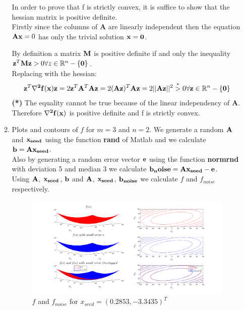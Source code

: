 \documentclass[12pt]{article}
\begin{document}
\begin{enumerate}
\begin{enumerate}
In order to prove that f is strictly convex, it is  suffice to show that the hessian matrix is positive definite.\\
Firstly since the columns of {\bf A} are linearly independent then the equation ${\bf A}{\bf x}=0$ has only the trivial solution ${{\bf x}={\bf 0}}$.

By definition a matrix ${\bf M}$ is positive definite if and only the inequality ${\bf z}^T{\bf M}{\bf z}>0 \forall z\in \mathbb{R}^n-\{{\bf 0}\}$.\\
Replacing with the hessian:\\
\begin{equation}
	\begin{split}
		{\bf z}^T{\bf \nabla^2f({\bf x})}{\bf z}=2{\bf z}^T{\bf A}^T{\bf A}{\bf z}=2({\bf A}{\bf z})^T{\bf A}{\bf z} = 2||{\bf A}{\bf z}||^2\overset{*}{>} 0 \forall {\bf z}\in \mathbb{R}^n -\{{\bf 0}\}
	\end{split}
\end{equation}
{\bf (*)} The equality cannot be true because of the linear independency of {\bf A}.\\

Therefore ${\bf \nabla^2f({\bf x})}$ is positive definite and f is strictly convex.\\

\item Plots and contours of $f$ for $m=3$ and $n=2$. We generate a random ${\bf A}$ and ${\bf x_{seed}}$ using the function {\bf rand} of Matlab and we calculate ${\bf b}={\bf A}{\bf x_{seed}}$.\\
Also by generating a random error vector ${\bf e}$ using the function {\bf normrnd} with deviation 5 and median 3 we calculate ${\bf b_noise}={\bf A}{\bf x_{seed}}-{\bf e}$.\\
Using ${\bf A}$, ${\bf x_{seed}}$, ${\bf b}$ and ${\bf A}$, ${\bf x_{seed}}$, ${\bf b_{noise}}$ we calculate $f$ and $f_{noise}$ respectively.
\begin{figure}[h!]
	\centering
	\includegraphics[width=\textwidth]{10.png}
	\caption{$f$ and $f_{noise}$ for $x_{seed}=(0.2853,-3.3435)^T$}
	\label{fig:10}
\end{figure}\\


\end{enumerate}
\end{enumerate}
\end{document}
